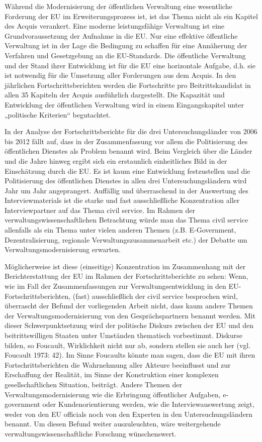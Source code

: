  Während die Modernisierung der öffentlichen Verwaltung eine wesentliche Forderung der EU im Erweiterungsprozess ist, ist das Thema nicht als ein Kapitel des Acquis verankert. Eine moderne leistungsfähige Verwaltung ist eine Grundvoraussetzung der Aufnahme in die EU. Nur eine effektive öffentliche Verwaltung ist in der Lage die Bedingung zu schaffen für eine Annäherung der Verfahren und Gesetzgebung an die EU-Standards. Die öffentliche Verwaltung und der Stand ihrer Entwicklung ist für die EU eine horizontale Aufgabe, d.h. sie ist notwendig für die Umsetzung aller Forderungen aus dem Acquis. In den jährlichen Fortschrittsberichten werden die Fortschritte pro Beitrittskandidat in allen 35 Kapiteln der Acquis ausführlich dargestellt. Die Kapazität und Entwicklung der öffentlichen Verwaltung wird in einem Eingangskapitel unter „politische Kriterien“ begutachtet.\par
In der Analyse der Fortschrittsberichte für die drei Untersuchungsländer von 2006 bis 2012 fällt auf, dass in der Zusammenfassung vor allem die Politisierung des öffentlichen Dienstes als Problem benannt wird. Beim Vergleich über die Länder und die Jahre hinweg ergibt sich ein erstaunlich einheitliches Bild in der Einschätzung durch die EU. Es ist kaum eine Entwicklung festzustellen und die Politisierung des öffentlichen Dienstes in allen drei Untersuchungsländern wird Jahr um Jahr angeprangert. Auffällig und überraschend in der Auswertung des Interviewmaterials ist die starke und fast ausschließliche Konzentration aller Interviewpartner auf das Thema civil service. Im Rahmen der verwaltungswissenschaftlichen Betrachtung würde man das Thema civil service allenfalls als ein Thema unter vielen anderen Themen (z.B. E-Government, Dezentralisierung, regionale Verwaltungszusammenarbeit etc.) der Debatte um Verwaltungsmodernisierung erwarten.\par
Möglicherweise ist diese (einseitige) Konzentration im Zusammenhang mit der Berichterstattung der EU im Rahmen der Fortschrittsberichte zu sehen: Wenn, wie im Fall der Zusammenfassungen zur Verwaltungsentwicklung in den EU-Fortschrittsberichten, (fast) ausschließlich der civil service besprochen wird, überrascht der Befund der vorliegenden Arbeit nicht, dass kaum andere Themen der Verwaltungsmodernisierung von den Gesprächspartnern benannt werden. Mit dieser Schwerpunktsetzung wird der politische Diskurs zwischen der EU und den beitrittswilligen Staaten unter Umständen thematisch vorbestimmt. Diskurse bilden, so Foucault, Wirklichkeit nicht nur ab, sondern stellen sie auch her (vgl. Foucault 1973: 42). Im Sinne Foucaults könnte man sagen, dass die EU mit ihren Fortschrittsberichten die Wahrnehmung aller Akteure beeinflusst und zur Erschaffung der Realität, im Sinne der Konstruktion einer komplexen gesellschaftlichen Situation, beiträgt. Andere Themen der Verwaltungsmodernisierung wie die Erbringung öffentlicher Aufgaben, e-government oder Kundenorientierung werden, wie die Interviewauswertung zeigt, weder von den EU officials noch von den Experten in den Untersuchungsländern benannt. Um diesen Befund weiter auszuleuchten, wäre weitergehende verwaltungswissenschaftliche Forschung wünschenswert. \par
